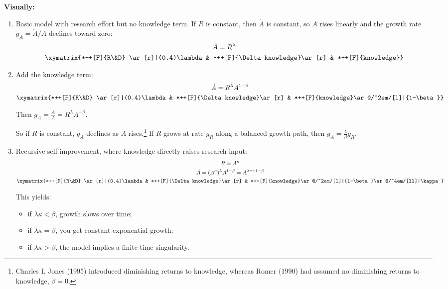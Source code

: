 \documentclass[
  11pt,
  letterpaper,
  DIV=11,
  numbers=noendperiod]{scrartcl}
\providecommand{\tightlist}{%
  \setlength{\itemsep}{0pt}\setlength{\parskip}{0pt}}
\begin{document}
\textbf{Visually:}

\begin{enumerate}
\def\labelenumi{\arabic{enumi}.}
\item
  Basic model with research effort but no knowledge term. If \(R\) is
  constant, then \(\dot{A}\) is constant, so \(A\) rises linearly and
  the growth rate \(g_A = \dot{A}/A\) declines toward zero:
  \[\begin{gathered}
   \dot{A}=R^\lambda\\
   \xymatrix{*++[F]{R\&D} \ar[r]|(0.4)\lambda & *++[F]{\Delta knowledge}\ar[r] & *++[F]{knowledge}}
   \end{gathered}
   \]
\item
  Add the knowledge term: \[\begin{gathered}
   \dot{A}=R^\lambda A^{1-\beta}\\
   \xymatrix{*++[F]{R\&D} \ar[r]|(0.4)\lambda & *++[F]{\Delta knowledge}\ar[r] & *++[F]{knowledge}\ar@/^2em/[l]|{1-\beta}}
   \end{gathered}
   \]

  Then \(g_A = \frac{\dot{A}}{A} = R^\lambda A^{-\beta}.\)

  So if \(R\) is constant, \(g_A\) declines as \(A\) rises.\footnote{Charles
    I. Jones (1995) introduced diminishing returns to knowledge, whereas
    Romer (1990) had assumed no diminishing returns to knowledge,
    \(\beta=0\).} If \(R\) grows at rate \(g_R\) along a balanced growth
  path, then \(g_A = \frac{\lambda}{\beta}g_R.\)
\item
  Recursive self-improvement, where knowledge directly raises research
  input: \[\begin{gathered}
   R=A^\kappa\\
   \dot{A}=(A^\kappa)^\lambda A^{1-\beta}=A^{\lambda\kappa+1-\beta}\\
   \xymatrix{*++[F]{R\&D} \ar[r]|(0.4)\lambda & *++[F]{\Delta knowledge}\ar[r] & *++[F]{knowledge}\ar@/^2em/[l]|{1-\beta}\ar@/^4em/[ll]|\kappa}
   \end{gathered}
   \]

  This yields:

  \begin{itemize}
  \tightlist
  \item
    if \(\lambda\kappa < \beta\), growth slows over time;
  \item
    if \(\lambda\kappa = \beta\), you get constant exponential growth;
  \item
    if \(\lambda\kappa > \beta\), the model implies a finite-time
    singularity.
  \end{itemize}
\end{enumerate}
\end{document}
